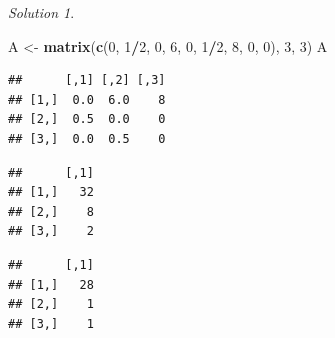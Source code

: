\documentclass[
]{book}
\newenvironment{Shaded}{\begin{snugshade}}{\end{snugshade}}
\newcommand{\CommentTok}[1]{\textcolor[rgb]{0.56,0.35,0.01}{\textit{#1}}}
\newcommand{\DecValTok}[1]{\textcolor[rgb]{0.00,0.00,0.81}{#1}}
\newcommand{\KeywordTok}[1]{\textcolor[rgb]{0.13,0.29,0.53}{\textbf{#1}}}
\newcommand{\NormalTok}[1]{#1}
\newcommand{\OperatorTok}[1]{\textcolor[rgb]{0.81,0.36,0.00}{\textbf{#1}}}
\newcommand{\StringTok}[1]{\textcolor[rgb]{0.31,0.60,0.02}{#1}}
\theoremstyle{definition}
\theoremstyle{definition}
\theoremstyle{definition}
\theoremstyle{definition}
\theoremstyle{remark}
\newtheorem*{solution}{Solution}
\begin{document}
\begin{solution}
\begin{Shaded}
\begin{Highlighting}[]
\NormalTok{A <-}\StringTok{ }\KeywordTok{matrix}\NormalTok{(}\KeywordTok{c}\NormalTok{(}\DecValTok{0}\NormalTok{, }\DecValTok{1}\OperatorTok{/}\DecValTok{2}\NormalTok{, }\DecValTok{0}\NormalTok{, }\DecValTok{6}\NormalTok{, }\DecValTok{0}\NormalTok{, }\DecValTok{1}\OperatorTok{/}\DecValTok{2}\NormalTok{, }\DecValTok{8}\NormalTok{, }\DecValTok{0}\NormalTok{, }\DecValTok{0}\NormalTok{), }\DecValTok{3}\NormalTok{, }\DecValTok{3}\NormalTok{)}
\NormalTok{A}
\end{Highlighting}
\end{Shaded}

\begin{verbatim}
##      [,1] [,2] [,3]
## [1,]  0.0  6.0    8
## [2,]  0.5  0.0    0
## [3,]  0.0  0.5    0
\end{verbatim}

\begin{Shaded}
\end{Shaded}

\begin{verbatim}
##      [,1]
## [1,]   32
## [2,]    8
## [3,]    2
\end{verbatim}

\begin{Shaded}
\end{Shaded}

\begin{verbatim}
##      [,1]
## [1,]   28
## [2,]    1
## [3,]    1
\end{verbatim}

\begin{Shaded}
\end{Shaded}

\end{solution}
\end{document}
